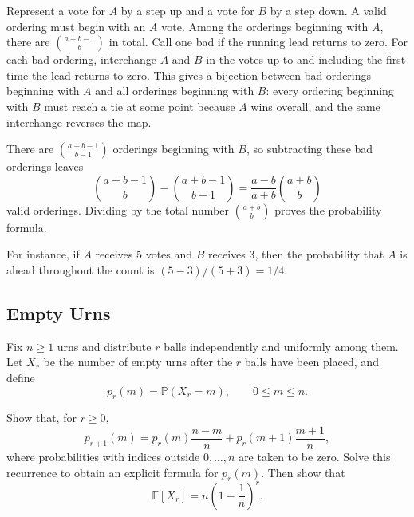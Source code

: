\documentclass[a4paper,11pt,abstracton]{scrartcl}
\theoremstyle{dotlessP}
\theoremstyle{dotlessS}
\theoremstyle{remark}
\theoremstyle{definition}
\begin{document}
\begin{claim_box}
Represent a vote for $A$ by a step up and a vote for $B$ by a step down. A valid ordering must begin with an $A$ vote. Among the orderings beginning with $A$, there are $\binom{a+b-1}{b}$ in total. Call one bad if the running lead returns to zero. For each bad ordering, interchange $A$ and $B$ in the votes up to and including the first time the lead returns to zero. This gives a bijection between bad orderings beginning with $A$ and all orderings beginning with $B$: every ordering beginning with $B$ must reach a tie at some point because $A$ wins overall, and the same interchange reverses the map.

There are $\binom{a+b-1}{b-1}$ orderings beginning with $B$, so subtracting these bad orderings leaves
\[
  \binom{a+b-1}{b}-\binom{a+b-1}{b-1}
  =\frac{a-b}{a+b}\binom{a+b}{b}
\]
valid orderings. Dividing by the total number $\binom{a+b}{b}$ proves the probability formula.
\end{claim_box}

For instance, if $A$ receives $5$ votes and $B$ receives $3$, then the probability that $A$ is ahead throughout the count is $(5-3)/(5+3)=1/4$.

\subsection{Empty Urns}

Fix $n\geq1$ urns and distribute $r$ balls independently and uniformly among them. Let $X_r$ be the number of empty urns after the $r$ balls have been placed, and define
\[
  p_r(m)=\mathbb{P}(X_r=m), \qquad 0\leq m\leq n.
\]

\begin{problem_box}
Show that, for $r\geq0$,
\[
  p_{r+1}(m)
  =p_r(m)\frac{n-m}{n}
   +p_r(m+1)\frac{m+1}{n},
\]
where probabilities with indices outside $0,\ldots,n$ are taken to be zero. Solve this recurrence to obtain an explicit formula for $p_r(m)$. Then show that
\[
  \mathbb{E}[X_r]=n\left(1-\frac{1}{n}\right)^r.
\]
\end{problem_box}
\end{document}
